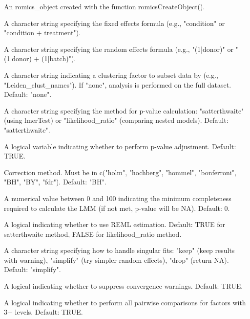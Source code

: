 \documentclass[a4paper]{book}
\begin{document}
\begin{Arguments}
\begin{ldescription}
\item[\code{romics\_object}] An romics\_object created with the function romicsCreateObject().

\item[\code{fixed\_effects}] A character string specifying the fixed effects formula (e.g., "condition" or "condition + treatment").

\item[\code{random\_effects}] A character string specifying the random effects formula (e.g., "(1|donor)" or "(1|donor) + (1|batch)").

\item[\code{cluster\_factor}] A character string indicating a clustering factor to subset data by (e.g., "Leiden\_clust\_names"). If "none", analysis is performed on the full dataset. Default: "none".

\item[\code{method}] A character string specifying the method for p-value calculation: "satterthwaite" (using lmerTest) or "likelihood\_ratio" (comparing nested models). Default: "satterthwaite".

\item[\code{padj}] A logical variable indicating whether to perform p-value adjustment. Default: TRUE.

\item[\code{padj\_method}] Correction method. Must be in c("holm", "hochberg", "hommel", "bonferroni", "BH", "BY", "fdr"). Default: "BH".

\item[\code{percentage\_completeness}] A numerical value between 0 and 100 indicating the minimum completeness required to calculate the LMM (if not met, p-value will be NA). Default: 0.

\item[\code{REML}] A logical indicating whether to use REML estimation. Default: TRUE for satterthwaite method, FALSE for likelihood\_ratio method.

\item[\code{handle\_singular}] A character string specifying how to handle singular fits: "keep" (keep results with warning), "simplify" (try simpler random effects), "drop" (return NA). Default: "simplify".

\item[\code{suppress\_warnings}] A logical indicating whether to suppress convergence warnings. Default: TRUE.

\item[\code{pairwise\_comparisons}] A logical indicating whether to perform all pairwise comparisons for factors with 3+ levels. Default: TRUE.
\end{ldescription}
\end{Arguments}
\end{document}
